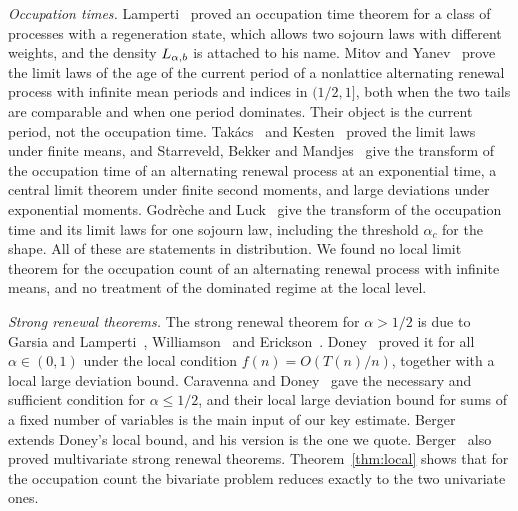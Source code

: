 \emph{Occupation times.} Lamperti~\cite{lamperti1958} proved an occupation time theorem for
a class of processes with a regeneration state, which allows two sojourn laws with different
weights, and the density $L_{\alpha,b}$ is attached to his name. Mitov and Yanev~\cite{mitovyanev2001}
prove the limit laws of the age of the current period of a nonlattice alternating renewal
process with infinite mean periods and indices in $(1/2,1]$, both when the two tails are
comparable and when one period dominates. Their object is the current period, not the
occupation time. Tak\'acs~\cite{takacs1957} and
Kesten~\cite{kesten1962} proved the limit laws under finite means, and Starreveld, Bekker and
Mandjes~\cite{sbm2018} give the transform of the occupation time of an alternating renewal
process at an exponential time, a central limit theorem under finite second moments, and large
deviations under exponential moments. Godr\`eche and Luck~\cite{godrecheluck2001} give the
transform of the occupation time and its limit laws for one sojourn law, including the
threshold $\alpha_c$ for the shape. All of these are statements in distribution. We found no
local limit theorem for the occupation count of an alternating renewal process with infinite
means, and no treatment of the dominated regime at the local level.

\emph{Strong renewal theorems.} The strong renewal theorem for $\alpha>1/2$ is due to Garsia
and Lamperti~\cite{garsialamperti1963}, Williamson~\cite{williamson1968} and
Erickson~\cite{erickson1970}. Doney~\cite{doney1997} proved it for all $\alpha\in(0,1)$ under
the local condition $f(n)=O(T(n)/n)$, together with a local large deviation bound. Caravenna
and Doney~\cite{caravennadoney2019} gave the necessary and sufficient condition for
$\alpha\le1/2$, and their local large deviation bound for sums of a fixed number of variables
is the main input of our key estimate. Berger~\cite{berger2019ptrf} extends Doney's local
bound, and his version is the one we quote. Berger~\cite{berger2019} also proved multivariate
strong renewal theorems. Theorem~\ref{thm:local} shows that for the occupation count the
bivariate problem reduces exactly to the two univariate ones.


